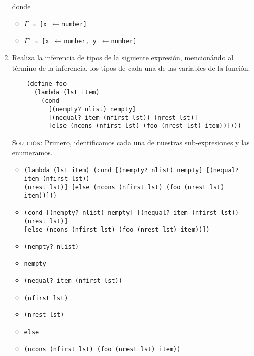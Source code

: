 \documentclass[letterpaper,11pt]{article}
\begin{document}
\begin{enumerate}
    donde 
    \begin{itemize}
        \item \texttt{$\Gamma$ = [x $\leftarrow$number]}
        \item \texttt{$\Gamma'$ = [x $\leftarrow$number, 
        y $\leftarrow$number]}
    \end{itemize}

    \item Realiza la inferencia de tipos de la siguiente expresión, mencionándo
    al término de la inferencia, los tipos de cada una de las variables de la 
    función.
    \begin{verbatim}
    (define foo 
      (lambda (lst item)
        (cond 
          [(nempty? nlist) nempty]
          [(nequal? item (nfirst lst)) (nrest lst)]
          [else (ncons (nfirst lst) (foo (nrest lst) item))])))
    \end{verbatim}

    \textsc{Solución:} Primero, identificamos cada una de nuestras 
    sub-expresiones y las enumeramos.
    \begin{itemize}
        \item {} \texttt{(lambda (lst item) (cond [(nempty? nlist) nempty]
        [(nequal? item (nfirst lst))} \\ 
        \texttt{(nrest lst)] [else (ncons (nfirst lst) (foo (nrest lst) item))]))}

        \item {} \texttt{(cond [(nempty? nlist) nempty] [(nequal? item 
        (nfirst lst)) (nrest lst)]} \\ 
        \texttt{[else (ncons (nfirst lst) (foo (nrest lst) item))])}

        \item {} \texttt{(nempty? nlist)}

        \item {} \texttt{nempty}
        
        \item {} \texttt{(nequal? item (nfirst lst))}

        \item {} \texttt{(nfirst lst)}
        
        \item {} \texttt{(nrest lst)}
        
        \item {} \texttt{else}
        
        \item {} \texttt{(ncons (nfirst lst) (foo (nrest lst) item))}


\end{itemize}
\end{enumerate}
\end{document}
